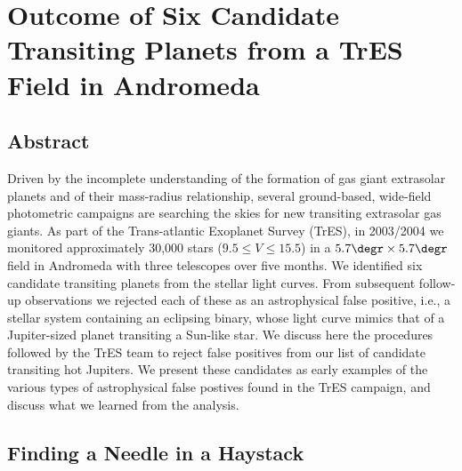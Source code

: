 \chapter[Outcome of Six Candidate Transiting Planets from a TrES Field in Andromeda]{Outcome of Six Candidate Transiting Planets from a TrES Field in Andromeda%
\protect\CFNB%
}
\label{cha:and0}

\section*{Abstract}
\label{cha:and0:sec:abs}

Driven by the incomplete understanding of the formation of gas giant extrasolar planets and of their mass-radius relationship, several ground-based, wide-field photometric campaigns are searching the skies for new transiting extrasolar gas giants. As part of the Trans-atlantic Exoplanet Survey (TrES), in 2003/2004 we monitored approximately 30,000 stars ($9 .5\leq V \leq 15.5$) in a $5.7\degr\times5.7\degr$ field in Andromeda with three telescopes over five months. We identified six candidate transiting planets from the stellar light curves. From subsequent follow-up observations we rejected each of these as an astrophysical false positive, i.e., a stellar system containing an eclipsing binary, whose light curve mimics that of a Jupiter-sized planet transiting a Sun-like star. We discuss here the procedures followed by the TrES team to reject false positives from our list of candidate transiting hot Jupiters. We present these candidates as early examples of the various types of astrophysical false postives found in the TrES campaign, and discuss what we learned from the analysis.

\section{Finding a Needle in a Haystack}
\label{cha:and0:sec:intro}

